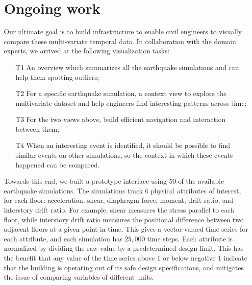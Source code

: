 \section{Ongoing work} %
\label{sec:vis}

Our ultimate goal is to build infrastructure to enable civil engineers to visually compare these multi-variate temporal data. In collaboration with the domain experts, we arrived at the following visualization tasks:
\begin{itemize}
	\item [T1] An overview which summarizes all the earthquake simulations and can help them spotting outliers;
	\item [T2] For a specific earthquake simulation, a context view to explore the multivariate dataset and help engineers find interesting patterns across time;
	\item [T3] For the two views above, build efficient navigation and interaction between them;
        \item [T4] When an interesting event is identified, it should be possible to find similar events on other simulations, so the context in which these events happened can be compared.
\end{itemize} 



Towards this end, we built a prototype interface using 50 of the available earthquake simulations.
The simulations track 6 physical attributes of interest, for each floor: acceleration, shear, diaphragm force, moment, drift ratio, and interstory drift ratio. For example, shear measures the stress parallel to each floor, while interstory drift ratio measures the positional difference between two adjacent floors at a given point in time. 
This gives a vector-valued time series for each attribute, and each simulation has $25,000$ time steps.
Each attribute is normalized by dividing the raw value by a predetermined design limit. This has the benefit that any value of the time series above 1 or below negative 1 indicate that the building is operating out of its safe design specifications, and mitigates the issue of comparing variables of different units.


